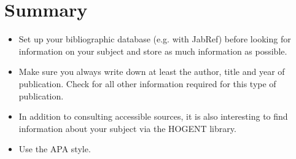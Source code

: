 \section{Summary}
\label{sec:bibliography-summary}

\begin{itemize}
  \item Set up your bibliographic database (e.g. with JabRef) before looking for information on your subject and store as much information as possible.
  \item Make sure you always write down at least the author, title and year of publication. Check for all other information required for this type of publication.
  \item In addition to consulting accessible sources, it is also interesting to find information about your subject via the HOGENT library.
  \item Use the APA style.
\end{itemize}
